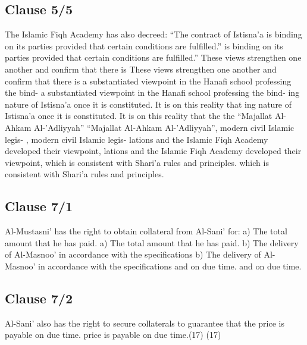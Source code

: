 \documentclass{article}%
\begin{document}
%
\subsection{Clause 5/5}%
\label{subsec:Clause5/5}%
The Islamic Fiqh Academy has also decreed: “The contract of Istisna’a  is binding on its parties provided that certain conditions are fulfilled.” is binding on its parties provided that certain conditions are fulfilled.”   These views strengthen one another and confirm that there is   These views strengthen one another and confirm that there is a substantiated viewpoint in the Hanafi school professing the bind- a substantiated viewpoint in the Hanafi school professing the bind- ing nature of Istisna’a once it is constituted. It is on this reality that  ing nature of Istisna’a once it is constituted. It is on this reality that  the  the “Majallat Al-Ahkam Al-’Adliyyah” “Majallat Al-Ahkam Al-’Adliyyah”, modern civil Islamic legis- , modern civil Islamic legis- lations and the Islamic Fiqh Academy developed their viewpoint,  lations and the Islamic Fiqh Academy developed their viewpoint,  which is consistent with Shari’a rules and principles. which is consistent with Shari’a rules and principles.

%
\subsection{Clause 7/1}%
\label{subsec:Clause7/1}%
Al-Mustasni’ has the right to obtain collateral from Al-Sani’ for: a) The total amount that he has paid. a) The total amount that he has paid. b) The delivery of Al-Masnoo’ in accordance with the specifications  b) The delivery of Al-Masnoo’ in accordance with the specifications  and on due time. and on due time.

%
\subsection{Clause 7/2}%
\label{subsec:Clause7/2}%
Al-Sani’ also has the right to secure collaterals to guarantee that the  price is payable on due time. price is payable on due time.(17) (17)

%
\end{document}
